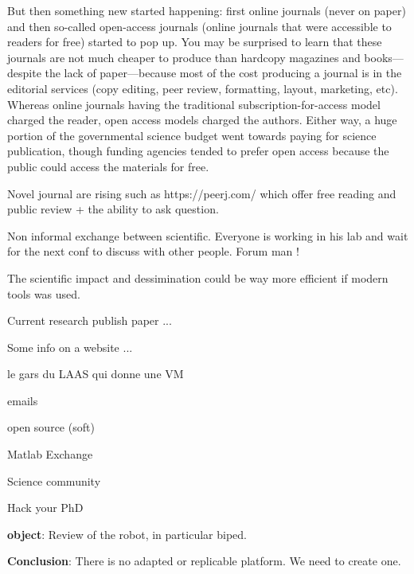 But then something new started happening: first online journals (never on paper) and then so-called open-access journals (online journals that were accessible to readers for free) started to pop up. You may be surprised to learn that these journals are not much cheaper to produce than hardcopy magazines and books—despite the lack of paper—because most of the cost producing a journal is in the editorial services (copy editing, peer review, formatting, layout, marketing, etc). Whereas online journals having the traditional subscription-for-access model charged the reader, open access models charged the authors. Either way, a huge portion of the governmental science budget went towards paying for science publication, though funding agencies tended to prefer open access because the public could access the materials for free.

Novel journal are rising such as https://peerj.com/ which offer free reading and public review + the ability to ask question.

Non informal exchange between scientific. Everyone is working in his lab and wait for the next conf to discuss with other people. Forum man !

The scientific impact and dessimination could be way more efficient if modern tools was used.

Current research
publish paper ...

Some info on a website ...

le gars du LAAS qui donne une VM

emails

open source (soft)

Matlab Exchange

Science community

Hack your PhD


\textbf{object}: Review of the robot, in particular biped.


\textbf{Conclusion}: There is no adapted or replicable platform. We need to create one.

